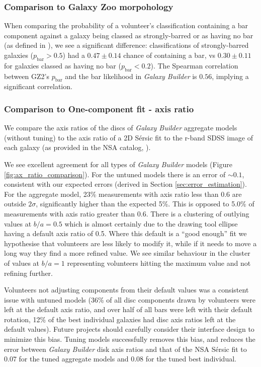 \documentclass[../main.tex]{subfiles}
\begin{document}
\subsubsection{Comparison to Galaxy Zoo morpohology}

When comparing the probability of a volunteer's classification containing a bar component against a galaxy being classed as strongly-barred or as having no bar (as defined in \citealt{Masters2010:1003.0449v2}), we see a significant difference: classifications of strongly-barred galaxies ($p_\text{bar} > 0.5$) had a $0.47 \pm 0.14$ chance of containing a bar, vs $0.30 \pm 0.11$ for galaxies classed as having no bar ($p_\text{bar} < 0.2$). The Spearman correlation between GZ2's $p_\text{bar}$ and the bar likelihood in \textit{Galaxy Builder} is $0.56$, implying a significant correlation.


\subsubsection{Comparison to One-component fit - axis ratio}
We compare the axis ratios of the discs of \textit{Galaxy Builder} aggregate models (without tuning) to the axis ratio of a 2D S\'ersic fit to the r-band SDSS image of each galaxy (as provided in the NSA catalog, \citealt{2011AJ....142...31B}).

We see excellent agreement for all types of \textit{Galaxy Builder} models (Figure \ref{fig:ax_ratio_comparison}). For the untuned models there is an error of $\sim0.1$, consistent with our expected errors (derived in Section \ref{sec:error_estimation}). For the aggregate model, 23\% measurements with axis ratio less than 0.6 are outside $2\sigma$, significantly higher than the expected 5\%. This is opposed to 5.0\% of measurements with axis ratio greater than 0.6. There is a clustering of outlying values at $b/a=0.5$ which is almost certainly due to the drawing tool ellipse having a default axis ratio of 0.5. Where this default is a ``good enough'' fit we hypothesise that volunteers are less likely to modify it, while if it needs to move a long way they find a more refined value. We see similar behaviour in the cluster of values at $b/a=1$ representing volunteers hitting the maximum value and not refining further.

Volunteers not adjusting components from their default values was a consistent issue with untuned models (36\% of all disc components drawn by volunteers were left at the default axis ratio, and over half of all bars were left with their default rotation, 12\% of the best individual galaxies had disc axis ratios left at the default values). Future projects should carefully consider their interface design to minimize this bias. Tuning models successfully removes this bias, and reduces the error between \textit{Galaxy Builder} disk axis ratios and that of the NSA S\'ersic fit to $0.07$ for the tuned aggregate models and $0.08$ for the tuned best individual.
\end{document}
